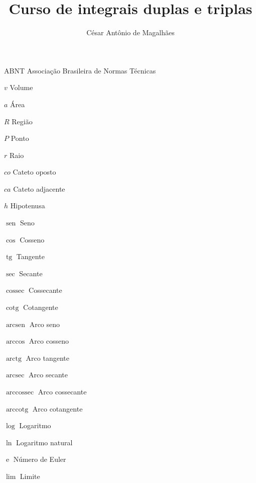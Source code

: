 \documentclass[
	12pt,				%
	openright,			%
	twoside,			%
	a4paper,			%
	english,			%
	french,				%
	spanish,			%
	brazil,				%
]{abntex2}
\title{Curso de integrais duplas e triplas}
\author{César Antônio de Magalhães}
\DeclareMathOperator{\sen}{sen}
\DeclareMathOperator{\tg}{tg}
\DeclareMathOperator{\cossec}{cossec}
\DeclareMathOperator{\cotg}{cotg}
\DeclareMathOperator{\arcsen}{arcsen}
\DeclareMathOperator{\arctg}{arctg}
\DeclareMathOperator{\arcsec}{arcsec}
\DeclareMathOperator{\arccossec}{arccossec}
\DeclareMathOperator{\arccotg}{arccotg}
\DeclareMathOperator{\e}{e}
\begin{document}

\frenchspacing 


\imprimircapa

\imprimirfolhaderosto


\listoffigures*
\cleardoublepage

\listoftables*
\cleardoublepage

\begin{siglas}
	\item[ABNT] Associação Brasileira de Normas Técnicas
	\item[$ v $] Volume
	\item[$ a $] Área
	\item[$ R $] Região
	\item[$ P $] Ponto
	\item[$ r $] Raio
	\item[$ co $] Cateto oposto
	\item[$ ca $] Cateto adjacente
	\item[$ h $] Hipotenusa
	\item[$\sen$] Seno
	\item[$ \cos $] Cosseno
	\item[$ \tg $] Tangente
	\item[$ \sec $] Secante
	\item[$ \cossec $] Cossecante
	\item[$ \cotg $] Cotangente
	\item[$ \arcsen $] Arco seno
	\item[$ \arccos $] Arco cosseno
	\item[$ \arctg $] Arco tangente
	\item[$ \arcsec $] Arco secante
	\item[$ \arccossec $] Arco cossecante
	\item[$ \arccotg $] Arco cotangente
	\item[$ \log $] Logaritmo
	\item[$ \ln $] Logaritmo natural
	\item[$ \e $] Número de Euler
	\item[$ \lim $] Limite	
\end{siglas}
\end{document}
